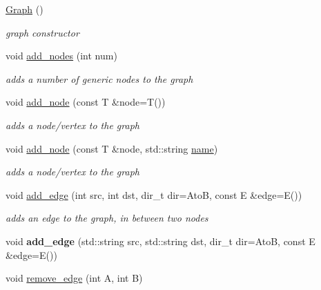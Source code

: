 \begin{DoxyCompactItemize}
\item 
\mbox{\label{classlitegraph_1_1Graph_a12cc129bd0eb148e5703d810a825318b}} 
\hyperlink{classlitegraph_1_1Graph_a12cc129bd0eb148e5703d810a825318b}{Graph} ()
\begin{DoxyCompactList}\small\item\em graph constructor \end{DoxyCompactList}\item 
void \hyperlink{classlitegraph_1_1Graph_a1f3eff13f5cf08258594bbe7cf40503b}{add\+\_\+nodes} (int num)
\begin{DoxyCompactList}\small\item\em adds a number of generic nodes to the graph \end{DoxyCompactList}\item 
void \hyperlink{classlitegraph_1_1Graph_a476c0aa77439348c6f829b614b619aeb}{add\+\_\+node} (const T \&node=T())
\begin{DoxyCompactList}\small\item\em adds a node/vertex to the graph \end{DoxyCompactList}\item 
void \hyperlink{classlitegraph_1_1Graph_ad218cf49859923a415ad838ba56b0ea2}{add\+\_\+node} (const T \&node, std\+::string \hyperlink{classlitegraph_1_1Graph_a48e0035e3e126eb0c6f23692d6fab16d}{name})
\begin{DoxyCompactList}\small\item\em adds a node/vertex to the graph \end{DoxyCompactList}\item 
void \hyperlink{classlitegraph_1_1Graph_ab99eb9988ddc5734afba373a97b44423}{add\+\_\+edge} (int src, int dst, dir\+\_\+t dir=AtoB, const E \&edge=E())
\begin{DoxyCompactList}\small\item\em adds an edge to the graph, in between two nodes \end{DoxyCompactList}\item 
\mbox{\label{classlitegraph_1_1Graph_aecce1029e4ec451ab609c474e00f283f}} 
void {\bfseries add\+\_\+edge} (std\+::string src, std\+::string dst, dir\+\_\+t dir=AtoB, const E \&edge=E())
\item 
void \hyperlink{classlitegraph_1_1Graph_a8a7a1e54a475668cdda309ee41501642}{remove\+\_\+edge} (int A, int B)

\end{DoxyCompactItemize}
